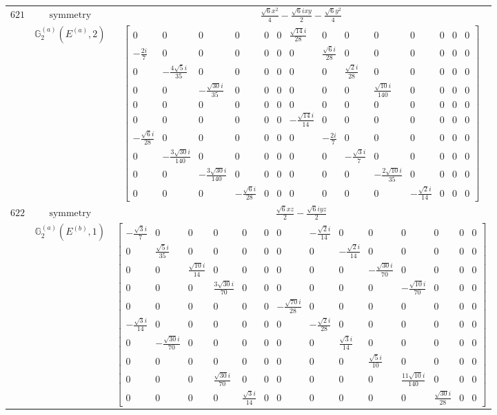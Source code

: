 \documentclass[fleqn,8pt,landscape]{jsarticle}
\begin{document}
\begin{longtable}{ccc}
$ 621 $ & $ \text{symmetry} $ & $ \frac{\sqrt{6} x^{2}}{4} - \frac{\sqrt{6} i x y}{2} - \frac{\sqrt{6} y^{2}}{4} $ \\
$  $ & $ \mathbb{G}_{2}^{(a)}(E^{(a)},2) $ & $ \begin{bmatrix} 0 & 0 & 0 & 0 & 0 & 0 & \frac{\sqrt{14} i}{28} & 0 & 0 & 0 & 0 & 0 & 0 & 0 \\ - \frac{2 i}{7} & 0 & 0 & 0 & 0 & 0 & 0 & \frac{\sqrt{6} i}{28} & 0 & 0 & 0 & 0 & 0 & 0 \\ 0 & - \frac{4 \sqrt{5} i}{35} & 0 & 0 & 0 & 0 & 0 & 0 & \frac{\sqrt{2} i}{28} & 0 & 0 & 0 & 0 & 0 \\ 0 & 0 & - \frac{\sqrt{30} i}{35} & 0 & 0 & 0 & 0 & 0 & 0 & \frac{\sqrt{10} i}{140} & 0 & 0 & 0 & 0 \\ 0 & 0 & 0 & 0 & 0 & 0 & 0 & 0 & 0 & 0 & 0 & 0 & 0 & 0 \\ 0 & 0 & 0 & 0 & 0 & 0 & - \frac{\sqrt{14} i}{14} & 0 & 0 & 0 & 0 & 0 & 0 & 0 \\ - \frac{\sqrt{6} i}{28} & 0 & 0 & 0 & 0 & 0 & 0 & - \frac{2 i}{7} & 0 & 0 & 0 & 0 & 0 & 0 \\ 0 & - \frac{3 \sqrt{30} i}{140} & 0 & 0 & 0 & 0 & 0 & 0 & - \frac{\sqrt{3} i}{7} & 0 & 0 & 0 & 0 & 0 \\ 0 & 0 & - \frac{3 \sqrt{30} i}{140} & 0 & 0 & 0 & 0 & 0 & 0 & - \frac{2 \sqrt{10} i}{35} & 0 & 0 & 0 & 0 \\ 0 & 0 & 0 & - \frac{\sqrt{6} i}{28} & 0 & 0 & 0 & 0 & 0 & 0 & - \frac{\sqrt{2} i}{14} & 0 & 0 & 0 \end{bmatrix} $ \\ \hline
$ 622 $ & $ \text{symmetry} $ & $ \frac{\sqrt{6} x z}{2} - \frac{\sqrt{6} i y z}{2} $ \\
$  $ & $ \mathbb{G}_{2}^{(a)}(E^{(b)},1) $ & $ \begin{bmatrix} - \frac{\sqrt{3} i}{7} & 0 & 0 & 0 & 0 & 0 & 0 & - \frac{\sqrt{2} i}{14} & 0 & 0 & 0 & 0 & 0 & 0 \\ 0 & \frac{\sqrt{5} i}{35} & 0 & 0 & 0 & 0 & 0 & 0 & - \frac{\sqrt{2} i}{14} & 0 & 0 & 0 & 0 & 0 \\ 0 & 0 & \frac{\sqrt{10} i}{14} & 0 & 0 & 0 & 0 & 0 & 0 & - \frac{\sqrt{30} i}{70} & 0 & 0 & 0 & 0 \\ 0 & 0 & 0 & \frac{3 \sqrt{30} i}{70} & 0 & 0 & 0 & 0 & 0 & 0 & - \frac{\sqrt{10} i}{70} & 0 & 0 & 0 \\ 0 & 0 & 0 & 0 & 0 & 0 & - \frac{\sqrt{70} i}{28} & 0 & 0 & 0 & 0 & 0 & 0 & 0 \\ - \frac{\sqrt{3} i}{14} & 0 & 0 & 0 & 0 & 0 & 0 & - \frac{\sqrt{2} i}{28} & 0 & 0 & 0 & 0 & 0 & 0 \\ 0 & - \frac{\sqrt{30} i}{70} & 0 & 0 & 0 & 0 & 0 & 0 & \frac{\sqrt{3} i}{14} & 0 & 0 & 0 & 0 & 0 \\ 0 & 0 & 0 & 0 & 0 & 0 & 0 & 0 & 0 & \frac{\sqrt{5} i}{10} & 0 & 0 & 0 & 0 \\ 0 & 0 & 0 & \frac{\sqrt{30} i}{70} & 0 & 0 & 0 & 0 & 0 & 0 & \frac{11 \sqrt{10} i}{140} & 0 & 0 & 0 \\ 0 & 0 & 0 & 0 & \frac{\sqrt{3} i}{14} & 0 & 0 & 0 & 0 & 0 & 0 & \frac{\sqrt{30} i}{28} & 0 & 0 \end{bmatrix} $ \\ \hline

\end{longtable}
\end{document}
